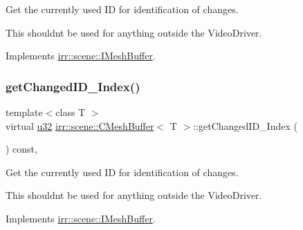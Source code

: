 Get the currently used ID for identification of changes. 

This shouldn\textquotesingle{}t be used for anything outside the Video\+Driver. 

Implements \hyperlink{classirr_1_1scene_1_1IMeshBuffer_acc389d76856dfb06c3ba45a92315e6d8}{irr\+::scene\+::\+I\+Mesh\+Buffer}.

\mbox{\label{classirr_1_1scene_1_1CMeshBuffer_aec6786022abd81ddf8d4e79a23628944}} 
\subsubsection{\texorpdfstring{get\+Changed\+I\+D\+\_\+\+Index()}{getChangedID\_Index()}\hspace{0.1cm}{\footnotesize\ttfamily [2/2]}}
{\footnotesize\ttfamily template$<$class T $>$ \\
virtual \hyperlink{namespaceirr_a0416a53257075833e7002efd0a18e804}{u32} \hyperlink{classirr_1_1scene_1_1CMeshBuffer}{irr\+::scene\+::\+C\+Mesh\+Buffer}$<$ T $>$\+::get\+Changed\+I\+D\+\_\+\+Index (\begin{DoxyParamCaption}{ }\end{DoxyParamCaption}) const\hspace{0.3cm}{\ttfamily [inline]}, {\ttfamily [virtual]}}



Get the currently used ID for identification of changes. 

This shouldn\textquotesingle{}t be used for anything outside the Video\+Driver. 

Implements \hyperlink{classirr_1_1scene_1_1IMeshBuffer_acc389d76856dfb06c3ba45a92315e6d8}{irr\+::scene\+::\+I\+Mesh\+Buffer}.

\mbox{\label{classirr_1_1scene_1_1CMeshBuffer_a99abc7d5f5a9f34221c58a598b33ce3a}} 
